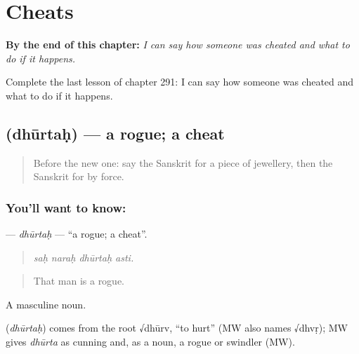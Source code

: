 
\chapter{Cheats}
\label{ch:sa-cheats}

\begin{chapteropening}
\textbf{By the end of this chapter:} \emph{I can say how someone was cheated and what to do if it happens.}

Complete the last lesson of chapter 291: I can say how someone was cheated and what to do if it happens.
\end{chapteropening}

\section[\texorpdfstring{\sk{धूर्तः} (dhūrtaḥ)}{धूर्तः (dhūrtaḥ)}]{ (dhūrtaḥ) — a rogue; a cheat}

\label{lesson:SA-C291-dhurtah}



\begin{quote}
Before the new one: say the Sanskrit for a piece of jewellery, then the Sanskrit for by force.
\end{quote}

\subsection*{You'll want to know: }
\textbf{} — \emph{dhūrtaḥ} — \textquotedblleft{}a rogue; a cheat\textquotedblright{}.

\begin{quote}
   
\end{quote}

\begin{quote}
\emph{saḥ naraḥ dhūrtaḥ asti.}
\end{quote}

\begin{quote}
That man is a rogue.
\end{quote}

A masculine noun.

\begin{cousinweb}
\textbf{} (\emph{dhūrtaḥ}) comes from the root √dhūrv, \textquotedblleft{}to hurt\textquotedblright{} (MW also names √dhvṛ); MW gives \emph{dhūrta} as cunning and, as a noun, a rogue or swindler (MW).
\end{cousinweb}

